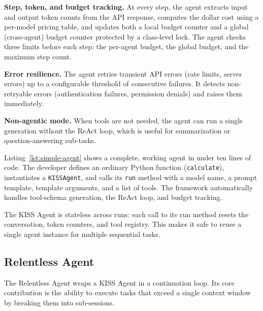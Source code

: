 \documentclass{article}
\begin{document}
\textbf{Step, token, and budget tracking.}  At every step, the agent extracts input and output token counts from the API response, computes the dollar cost using a per-model pricing table, and updates both a local budget counter and a global (cross-agent) budget counter protected by a class-level lock.  The agent checks three limits before each step: the per-agent budget, the global budget, and the maximum step count.

\textbf{Error resilience.}  The agent retries transient API errors (rate limits, server errors) up to a configurable threshold of consecutive failures.  It detects non-retryable errors (authentication failures, permission denials) and raises them immediately.

\textbf{Non-agentic mode.}  When tools are not needed, the agent can run a single generation without the ReAct loop, which is useful for summarization or question-answering sub-tasks.

Listing~\ref{lst:simple-agent} shows a complete, working agent in under ten lines of code.  The developer defines an ordinary Python function (\texttt{calculate}), instantiates a \texttt{KISSAgent}, and calls its \texttt{run} method with a model name, a prompt template, template arguments, and a list of tools.  The framework automatically handles tool-schema generation, the ReAct loop, and budget tracking.

The KISS Agent is stateless across runs: each call to its run method resets the conversation, token counters, and tool registry.  This makes it safe to reuse a single agent instance for multiple sequential tasks.

\subsection{Relentless Agent}
\label{sec:relentless-agent}

The Relentless Agent wraps a KISS Agent in a continuation loop.  Its core contribution is the ability to execute tasks that exceed a single context window by breaking them into sub-sessions.
\end{document}
